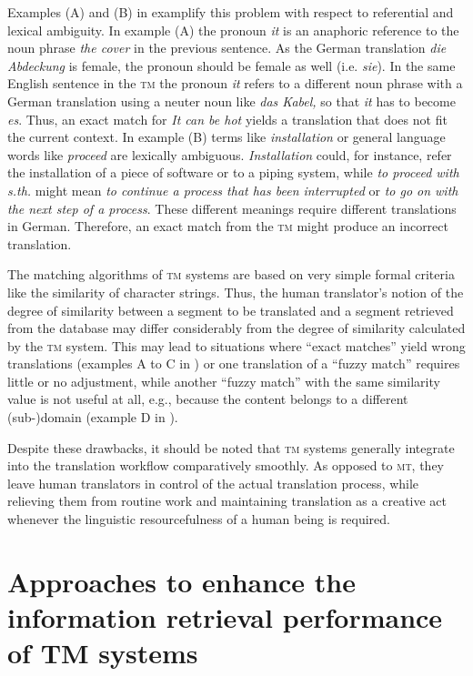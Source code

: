 \documentclass[output=paper]{LSP/langsci}
\begin{document}
Examples (A) and (B) in  examplify this problem with respect to referential and lexical ambiguity. In example (A) the pronoun \textit{it} is an anaphoric reference to the noun phrase \textit{the cover} in the previous sentence. As the German translation \textit{die Abdeckung} is female, the pronoun should be female as well (i.e. \textit{sie}). In the same English sentence in the \textsc{tm} the pronoun \textit{it} refers to a different noun phrase with a German translation using a neuter noun like \textit{das Kabel,} so that \textit{it} has to become \textit{es}. Thus, an exact match for \textit{It can be hot} yields a translation that does not fit the current context. In example (B) terms like \textit{installation }or general language words like \textit{proceed} are lexically ambiguous. \textit{Installation} could, for instance, refer the installation of a piece of software or to a piping system, while \textit{to proceed with s.th.} might mean \textit{to continue a process that has been interrupted} or \textit{to go on with the next step of a process}. These different meanings require different translations in German. Therefore, an exact match from the \textsc{tm} might produce an incorrect translation.
 
The matching algorithms of \textsc{tm} systems are based on very simple formal criteria like the similarity of character strings. Thus, the human translator's notion of the degree of similarity between a segment to be translated and a segment retrieved from the database may differ considerably from the degree of similarity calculated by the \textsc{tm} system. This may lead to situations where ``exact matches'' yield wrong translations (examples A to C in ) or one translation of a ``fuzzy match'' requires little or no adjustment, while another ``fuzzy match'' with the same similarity value is not useful at all, e.g., because the content belongs to a different (sub-)domain (example D in ).
 
Despite these drawbacks, it should be noted that \textsc{tm} systems generally integrate into the translation workflow comparatively smoothly. As opposed to \textsc{mt}, they leave human translators in control of the actual translation process, while relieving them from routine work and maintaining translation as a creative act whenever the linguistic resourcefulness of a human being is required.
 
\section{Approaches to enhance the information retrieval performance of TM systems}\label{sec:3}
\end{document}
